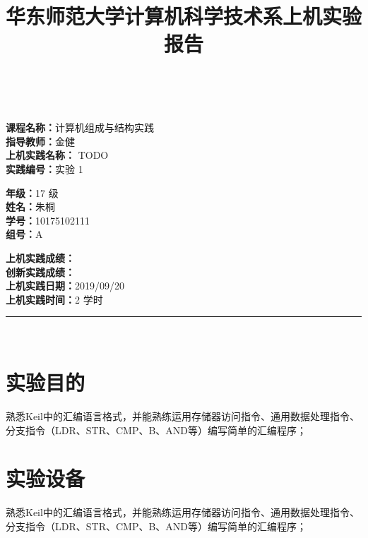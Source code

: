 \documentclass[a4paper,10pt,UTF8]{paper}
\title{华东师范大学计算机科学技术系上机实验报告}
\numberwithin{equation}{section}
\numberwithin{figure}{section}
\begin{document}
\pagestyle{fancy}
\lhead{}
\rhead{}
\makeatletter
\def\headrule{{\if@fancyplain\let\headrulewidth\plainheadrulewidth\fi%
\color{gray}\hrule\@height 0.2pt\@width\headwidth}
  \vspace{6mm}}
\makeatother

\newcommand{\HRule}{\rule{\linewidth}{1mm}}
\newcommand{\dai}{\textbf{Dais-CMX16$^+$}}

{ \\ [0.8cm]

\small{
  \begin{minipage}[t]{.32\linewidth}
    \textbf{课程名称：}计算机组成与结构实践\\
    \textbf{指导教师：}金健\\
    \textbf{上机实践名称：} TODO\\
    \textbf{实践编号：}实验 1
  \end{minipage}
  \begin{minipage}[t]{.32\linewidth}
    \textbf{年级：}17 级\\
    \textbf{姓名：}朱桐\\
    \textbf{学号：}10175102111\\
    \textbf{组号：}A
  \end{minipage} 
  \begin{minipage}[t]{.32\linewidth}
    \textbf{上机实践成绩：} \\
    \textbf{创新实践成绩：} \\
    \textbf{上机实践日期：}2019/09/20\\
    \textbf{上机实践时间：}2 学时\\
  \end{minipage}
}
\HRule \\[0.5cm]
}
\section{实验目的}

熟悉Keil中的汇编语言格式，并能熟练运用存储器访问指令、通用数据处理指令、分支指令（LDR、STR、CMP、B、AND等）编写简单的汇编程序；


\section{实验设备}

熟悉Keil中的汇编语言格式，并能熟练运用存储器访问指令、通用数据处理指令、分支指令（LDR、STR、CMP、B、AND等）编写简单的汇编程序；
\end{document}
